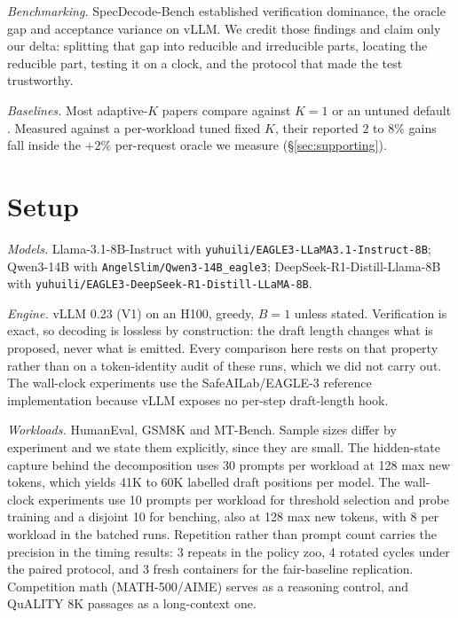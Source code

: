 \documentclass[conference]{IEEEtran}
\begin{document}
\emph{Benchmarking.} SpecDecode-Bench \cite{specdecodebench} established verification
dominance, the oracle gap and acceptance variance on vLLM. We credit those findings and claim
only our delta: splitting that gap into reducible and irreducible parts, locating the
reducible part, testing it on a clock, and the protocol that made the test trustworthy.

\emph{Baselines.} Most adaptive-$K$ papers compare against $K{=}1$ or an untuned default
\cite{zhang2024svip,adaedl,specdec,ddd}.
Measured against a per-workload tuned fixed $K$, their reported $2$ to $8\%$ gains fall inside
the $+2\%$ per-request oracle we measure (\S\ref{sec:supporting}).

\section{Setup}
\label{sec:setup}
\emph{Models.} Llama-3.1-8B-Instruct with \texttt{yuhuili/\allowbreak EAGLE3-LLaMA3.1-Instruct-8B};
Qwen3-14B with \texttt{AngelSlim/\allowbreak Qwen3-14B\_eagle3}; DeepSeek-R1-Distill-Llama-8B with
\texttt{yuhuili/\allowbreak EAGLE3-DeepSeek-R1-\allowbreak Distill-LLaMA-8B}.

\emph{Engine.} vLLM 0.23 (V1) on an H100, greedy, $B{=}1$ unless stated. Verification is
exact, so decoding is lossless by construction: the draft length changes what is proposed,
never what is emitted. Every comparison here rests on that property rather than on a
token-identity audit of these runs, which we did not carry out. The wall-clock experiments use
the SafeAILab/EAGLE-3 reference implementation because vLLM exposes no per-step draft-length
hook.

\emph{Workloads.} HumanEval, GSM8K and MT-Bench. Sample sizes differ by experiment and we
state them explicitly, since they are small. The hidden-state capture behind the decomposition
uses 30 prompts per workload at 128 max new tokens, which yields 41K to 60K labelled draft
positions per model. The wall-clock experiments use 10 prompts per workload for threshold
selection and probe training and a disjoint 10 for benching, also at 128 max new tokens, with
8 per workload in the batched runs. Repetition rather than prompt count carries the precision
in the timing results: 3 repeats in the policy zoo, 4 rotated cycles under the paired protocol,
and 3 fresh containers for the fair-baseline replication. Competition math
(MATH-500/AIME) serves as a reasoning control, and QuALITY 8K passages as a long-context one.
\end{document}
